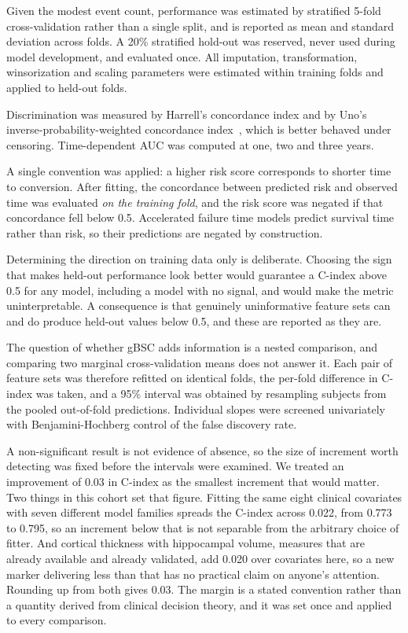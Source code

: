 \documentclass[blue]{ludusofficial}  %
\begin{document}
Given the modest event count, performance was estimated by stratified 5-fold cross-validation rather than a single split, and is reported as mean and standard deviation across folds. A 20\% stratified hold-out was reserved, never used during model development, and evaluated once. All imputation, transformation, winsorization and scaling parameters were estimated within training folds and applied to held-out folds.

Discrimination was measured by Harrell's concordance index and by Uno's inverse-probability-weighted concordance index~\cite{uno2011cstat}, which is better behaved under censoring. Time-dependent AUC was computed at one, two and three years.

A single convention was applied: a higher risk score corresponds to shorter time to conversion. After fitting, the concordance between predicted risk and observed time was evaluated \textit{on the training fold}, and the risk score was negated if that concordance fell below 0.5. Accelerated failure time models predict survival time rather than risk, so their predictions are negated by construction.

Determining the direction on training data only is deliberate. Choosing the sign that makes held-out performance look better would guarantee a C-index above 0.5 for any model, including a model with no signal, and would make the metric uninterpretable. A consequence is that genuinely uninformative feature sets can and do produce held-out values below 0.5, and these are reported as they are.

The question of whether gBSC adds information is a nested comparison, and comparing two marginal cross-validation means does not answer it. Each pair of feature sets was therefore refitted on identical folds, the per-fold difference in C-index was taken, and a 95\% interval was obtained by resampling subjects from the pooled out-of-fold predictions. Individual slopes were screened univariately with Benjamini-Hochberg control of the false discovery rate.

A non-significant result is not evidence of absence, so the size of increment worth detecting was fixed before the intervals were examined. We treated an improvement of 0.03 in C-index as the smallest increment that would matter. Two things in this cohort set that figure. Fitting the same eight clinical covariates with seven different model families spreads the C-index across 0.022, from 0.773 to 0.795, so an increment below that is not separable from the arbitrary choice of fitter. And cortical thickness with hippocampal volume, measures that are already available and already validated, add 0.020 over covariates here, so a new marker delivering less than that has no practical claim on anyone's attention. Rounding up from both gives 0.03. The margin is a stated convention rather than a quantity derived from clinical decision theory, and it was set once and applied to every comparison.
\end{document}
